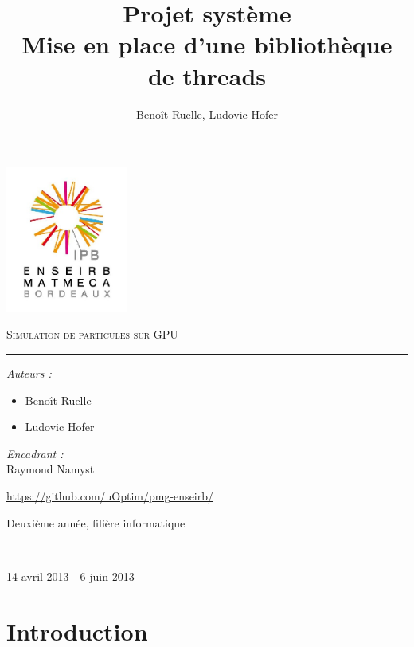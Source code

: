\documentclass{article}
\title{Projet système \\ Mise en place d'une bibliothèque de threads}
\author{Benoît Ruelle, Ludovic Hofer}
\begin{document}
\begin{center}
  \includegraphics [width=40mm]{ENSEIRB-MATMECA.jpg} 


\textsc{\Huge Simulation de particules sur GPU}\\[0.5cm]
\rule{0.4\textwidth}{1pt}


\begin{center}
  
  \begin{flushleft}
    \large
    \emph{Auteurs :}\\
    \begin{itemize}
    \item Benoît Ruelle
    \item Ludovic Hofer
    \end{itemize}
  \end{flushleft}
  
  
  \begin{flushright}
    \large
    \emph{Encadrant :}\\
    Raymond Namyst
  \end{flushright}
\end{center}


{\large \url{https://github.com/uOptim/pmg-enseirb/}}


{\large Deuxième année, filière informatique}

~

{\large 14 avril 2013 - 6 juin 2013}\\

\end{center}
\thispagestyle{empty}
\pagebreak
\tableofcontents
\newpage

\section{Introduction}
\end{document}
